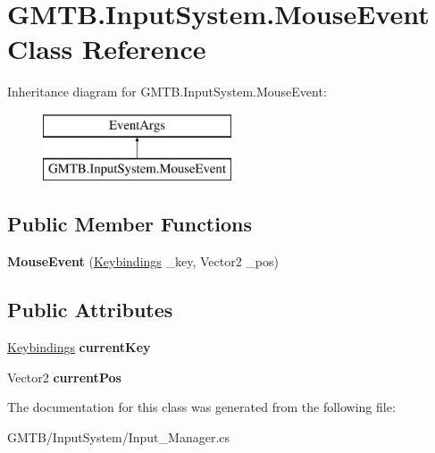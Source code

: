\hypertarget{class_g_m_t_b_1_1_input_system_1_1_mouse_event}{}\section{G\+M\+T\+B.\+Input\+System.\+Mouse\+Event Class Reference}
\label{class_g_m_t_b_1_1_input_system_1_1_mouse_event}
Inheritance diagram for G\+M\+T\+B.\+Input\+System.\+Mouse\+Event\+:\begin{figure}[H]
\begin{center}
\leavevmode
\includegraphics[height=2.000000cm]{class_g_m_t_b_1_1_input_system_1_1_mouse_event}
\end{center}
\end{figure}
\subsection*{Public Member Functions}
\begin{DoxyCompactItemize}
\item 
\mbox{\label{class_g_m_t_b_1_1_input_system_1_1_mouse_event_ae957767cde59c434903dcd7f527a1c13}} 
{\bfseries Mouse\+Event} (\mbox{\hyperlink{namespace_g_m_t_b_1_1_input_system_a29c73b630f79093ef12619656209d6c1}{Keybindings}} \+\_\+key, Vector2 \+\_\+pos)
\end{DoxyCompactItemize}
\subsection*{Public Attributes}
\begin{DoxyCompactItemize}
\item 
\mbox{\label{class_g_m_t_b_1_1_input_system_1_1_mouse_event_a58e3413fe6728275d1b8182f5cb23f12}} 
\mbox{\hyperlink{namespace_g_m_t_b_1_1_input_system_a29c73b630f79093ef12619656209d6c1}{Keybindings}} {\bfseries current\+Key}
\item 
\mbox{\label{class_g_m_t_b_1_1_input_system_1_1_mouse_event_a3f9784fbc3802d7e7724cf848793917d}} 
Vector2 {\bfseries current\+Pos}
\end{DoxyCompactItemize}


The documentation for this class was generated from the following file\+:\begin{DoxyCompactItemize}
\item 
G\+M\+T\+B/\+Input\+System/Input\+\_\+\+Manager.\+cs\end{DoxyCompactItemize}
